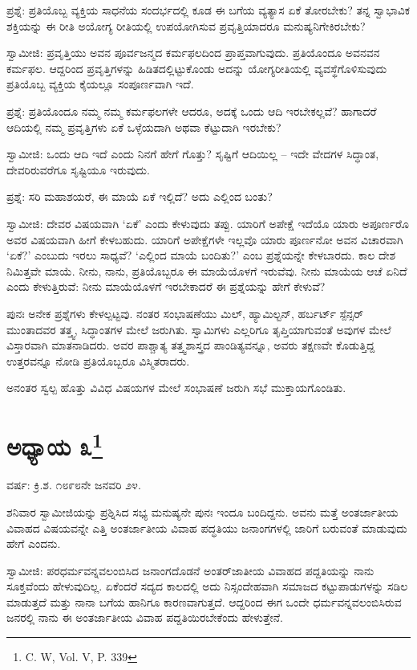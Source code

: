 ಪ್ರಶ್ನೆ: ಪ್ರತಿಯೊಬ್ಬ ವ್ಯಕ್ತಿಯ ಸಾಧನೆಯ ಸಂದರ್ಭದಲ್ಲಿ ಕೂಡ ಈ ಬಗೆಯ ವ್ಯತ್ಯಾಸ ಏಕೆ ತೋರಬೇಕು? ತನ್ನ ಸ್ವಾಭಾವಿಕ ಶಕ್ತಿಯನ್ನು ಈ ರೀತಿ ಅಯೋಗ್ಯ ರೀತಿಯಲ್ಲಿ ಉಪಯೋಗಿಸುವ ಪ್ರವೃತ್ತಿಯಾದರೂ ಮನುಷ್ಯನಿಗೇಕಿರಬೇಕು?

ಸ್ವಾಮೀಜಿ: ಪ್ರವೃತ್ತಿಯು ಅವನ ಪೂರ್ವಜನ್ಮದ ಕರ್ಮಫಲದಿಂದ ಪ್ರಾಪ್ತವಾಗುವುದು. ಪ್ರತಿಯೊಂದೂ ಅವನವನ ಕರ್ಮಫಲ. ಆದ್ದರಿಂದ ಪ್ರವೃತ್ತಿಗಳನ್ನು ಹಿಡಿತದಲ್ಲಿಟ್ಟುಕೊಂಡು ಅದನ್ನು ಯೋಗ್ಯರೀತಿಯಲ್ಲಿ ವ್ಯವಸ್ಥೆಗೊಳಿಸುವುದು ಪ್ರತಿಯೊಬ್ಬ ವ್ಯಕ್ತಿಯ ಕೈಯಲ್ಲೂ ಸಂಪೂರ್ಣವಾಗಿ ಇದೆ.

ಪ್ರಶ್ನೆ: ಪ್ರತಿಯೊಂದೂ ನಮ್ಮ ನಮ್ಮ ಕರ್ಮಫಲಗಳೇ ಆದರೂ, ಅದಕ್ಕೆ ಒಂದು ಆದಿ ಇರಬೇಕಲ್ಲವೆ? ಹಾಗಾದರೆ ಆದಿಯಲ್ಲಿ ನಮ್ಮ ಪ್ರವೃತ್ತಿಗಳು ಏಕೆ ಒಳ್ಳೆಯದಾಗಿ ಅಥವಾ ಕೆಟ್ಟುದಾಗಿ ಇರಬೇಕು?

ಸ್ವಾಮೀಜಿ: ಒಂದು ಆದಿ ಇದೆ ಎಂದು ನಿನಗೆ ಹೇಗೆ ಗೊತ್ತು? ಸೃಷ್ಟಿಗೆ ಆದಿಯಿಲ್ಲ – ಇದೇ ವೇದಗಳ ಸಿದ್ಧಾಂತ, ದೇವರಿರುವರೆಗೂ ಸೃಷ್ಟಿಯೂ ಇರುವುದು.

ಪ್ರಶ್ನೆ: ಸರಿ ಮಹಾಶಯರೆ, ಈ ಮಾಯೆ ಏಕೆ ಇಲ್ಲಿದೆ? ಅದು ಎಲ್ಲಿಂದ ಬಂತು?

ಸ್ವಾಮೀಜಿ: ದೇವರ ವಿಷಯವಾಗಿ ‘ಏಕೆ’ ಎಂದು ಕೇಳುವುದು ತಪ್ಪು. ಯಾರಿಗೆ ಅಪೇಕ್ಷೆ ಇದೆಯೊ ಯಾರು ಅಪೂರ್ಣರೊ ಅವರ ವಿಷಯವಾಗಿ ಹೀಗೆ ಕೇಳಬಹುದು. ಯಾರಿಗೆ ಅಪೇಕ್ಷೆಗಳೇ ಇಲ್ಲವೊ ಯಾರು ಪೂರ್ಣನೋ ಅವನ ವಿಚಾರವಾಗಿ ‘ಏಕೆ?’ ಎಂಬುದು ಇರಲು ಸಾಧ್ಯವೆ? ‘ಎಲ್ಲಿಂದ ಮಾಯೆ ಬಂದಿತು?’ ಎಂಬ ಪ್ರಶ್ನೆಯನ್ನೇ ಕೇಳಬಾರದು. ಕಾಲ ದೇಶ ನಿಮಿತ್ತವೇ ಮಾಯೆ. ನೀನು, ನಾನು, ಪ್ರತಿಯೊಬ್ಬರೂ ಈ ಮಾಯೆಯೊಳಗೆ ಇರುವೆವು. ನೀನು ಮಾಯೆಯ ಆಚೆ ಏನಿದೆ ಎಂದು ಕೇಳುತ್ತಿರುವೆ: ನೀನು ಮಾಯೆಯೊಳಗೆ ಇರಬೇಕಾದರೆ ಈ ಪ್ರಶ್ನೆಯನ್ನು ಹೇಗೆ ಕೇಳುವೆ?

ಪುನಃ ಅನೇಕ ಪ್ರಶ್ನೆಗಳು ಕೇಳಲ್ಪಟ್ಟವು. ನಂತರ ಸಂಭಾಷಣೆಯು ಮಿಲ್, ಹ್ಯಾಮಿಲ್ಟನ್, ಹರ್ಬರ್ಟ್ ಸ್ಪೆನ್ಸರ್ ಮುಂತಾದವರ ತತ್ತ್ವ, ಸಿದ್ಧಾಂತಗಳ ಮೇಲೆ ಜರುಗಿತು. ಸ್ವಾಮಿಗಳು ಎಲ್ಲರಿಗೂ ತೃಪ್ತಿಯಾಗುವಂತೆ ಅವುಗಳ ಮೇಲೆ ವಿಸ್ತಾರವಾಗಿ ಮಾತನಾಡಿದರು. ಅವರ ಪಾಶ್ಚಾತ್ಯ ತತ್ತ್ವಶಾಸ್ತ್ರದ ಪಾಂಡಿತ್ಯವನ್ನೂ, ಅವರು ತಕ್ಷಣವೇ ಕೊಡುತ್ತಿದ್ದ ಉತ್ತರವನ್ನೂ ನೋಡಿ ಪ್ರತಿಯೊಬ್ಬರೂ ವಿಸ್ಮಿತರಾದರು.

ಅನಂತರ ಸ್ವಲ್ಪ ಹೊತ್ತು ವಿವಿಧ ವಿಷಯಗಳ ಮೇಲೆ ಸಂಭಾಷಣೆ ಜರುಗಿ ಸಭೆ ಮುಕ್ತಾಯಗೊಂಡಿತು.

\newpage

\chapter[ಅಧ್ಯಾಯ ೩]{ಅಧ್ಯಾಯ ೩\protect\footnote{\engfoot{} C. W, Vol. V, P. 339}}

\begin{center}
ವರ್ಷ: ಕ್ರಿ.ಶ. ೧೮೯೮ನೇ ಜನವರಿ ೨೪.
\end{center}

ಶನಿವಾರ ಸ್ವಾಮೀಜಿಯನ್ನು ಪ್ರಶ್ನಿಸಿದ ಸಭ್ಯ ಮನುಷ್ಯನೇ ಪುನಃ ಇಂದೂ ಬಂದಿದ್ದನು. ಅವನು ಮತ್ತೆ ಅಂತರ್ಜಾತೀಯ ವಿವಾಹದ ವಿಷಯವನ್ನೇ ಎತ್ತಿ ಅಂತರ್ಜಾತೀಯ ವಿವಾಹ ಪದ್ಧತಿಯು ಜನಾಂಗಗಳಲ್ಲಿ ಜಾರಿಗೆ ಬರುವಂತೆ ಮಾಡುವುದು ಹೇಗೆ ಎಂದನು.

ಸ್ವಾಮೀಜಿ: ಪರಧರ್ಮವನ್ನವಲಂಬಿಸಿದ ಜನಾಂಗದೊಡನೆ ಅಂತರ್‌ಜಾತೀಯ ವಿವಾಹದ ಪದ್ದತಿಯನ್ನು ನಾನು ಸೂಕ್ತವೆಂದು ಹೇಳುವುದಿಲ್ಲ. ಏಕೆಂದರೆ ಸದ್ಯದ ಕಾಲದಲ್ಲಿ ಅದು ನಿಸ್ಸಂದೇಹವಾಗಿ ಸಮಾಜದ ಕಟ್ಟುಪಾಡುಗಳನ್ನು ಸಡಿಲ ಮಾಡುತ್ತದೆ ಮತ್ತು ನಾನಾ ಬಗೆಯ ಹಾನಿಗೂ ಕಾರಣವಾಗುತ್ತದೆ. ಆದ್ದರಿಂದ ಈಗ ಒಂದೇ ಧರ್ಮವನ್ನವಲಂಬಿಸಿರುವ ಜನರಲ್ಲಿ ನಾನು ಈ ಅಂತರ್ಜಾತೀಯ ವಿವಾಹ ಪದ್ದತಿಯಿರಬೇಕೆಂದು ಹೇಳುತ್ತೇನೆ.

